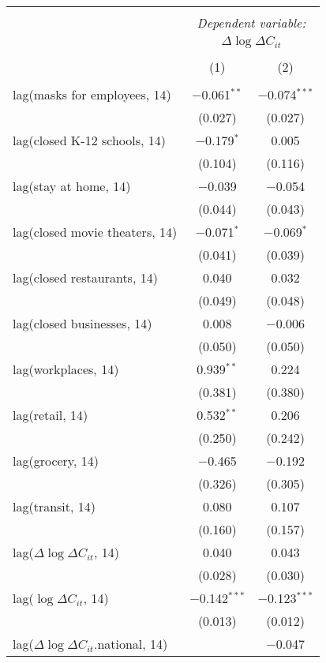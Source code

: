 \begin{tabular}{@{\extracolsep{1pt}}lcc} 
\\[-1.8ex]\hline 
\hline \\[-1.8ex] 
 & \multicolumn{2}{c}{\textit{Dependent variable:}} \\ 
\cline{2-3} 
 & \multicolumn{2}{c}{$\Delta \log \Delta C_{it}$} \\ 
\\[-1.8ex] & (1) & (2)\\ 
\hline \\[-1.8ex] 
 lag(masks for employees, 14) & $-$0.061$^{**}$ & $-$0.074$^{***}$ \\ 
  & (0.027) & (0.027) \\ 
  lag(closed K-12 schools, 14) & $-$0.179$^{*}$ & 0.005 \\ 
  & (0.104) & (0.116) \\ 
  lag(stay at home, 14) & $-$0.039 & $-$0.054 \\ 
  & (0.044) & (0.043) \\ 
  lag(closed movie theaters, 14) & $-$0.071$^{*}$ & $-$0.069$^{*}$ \\ 
  & (0.041) & (0.039) \\ 
  lag(closed restaurants, 14) & 0.040 & 0.032 \\ 
  & (0.049) & (0.048) \\ 
  lag(closed businesses, 14) & 0.008 & $-$0.006 \\ 
  & (0.050) & (0.050) \\ 
  lag(workplaces, 14) & 0.939$^{**}$ & 0.224 \\ 
  & (0.381) & (0.380) \\ 
  lag(retail, 14) & 0.532$^{**}$ & 0.206 \\ 
  & (0.250) & (0.242) \\ 
  lag(grocery, 14) & $-$0.465 & $-$0.192 \\ 
  & (0.326) & (0.305) \\ 
  lag(transit, 14) & 0.080 & 0.107 \\ 
  & (0.160) & (0.157) \\ 
  lag($\Delta \log \Delta C_{it}$, 14) & 0.040 & 0.043 \\ 
  & (0.028) & (0.030) \\ 
  lag($\log \Delta C_{it}$, 14) & $-$0.142$^{***}$ & $-$0.123$^{***}$ \\ 
  & (0.013) & (0.012) \\ 
  lag($\Delta \log \Delta C_{it}$.national, 14) &  & $-$0.047 \\ 

\end{tabular}
